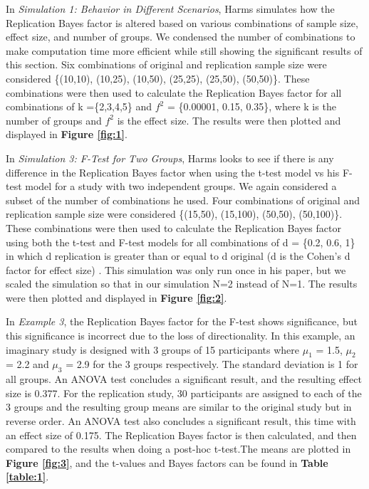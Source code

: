 \documentclass[11pt]{article}
\begin{document}
In \textit{Simulation 1: Behavior in Different Scenarios}, Harms simulates how the Replication Bayes factor is altered based on various combinations of sample size, effect size, and number of groups. We condensed the number of combinations to make computation time more efficient while still showing the significant results of this section. Six combinations of original and replication sample size were considered \{(10,10), (10,25), (10,50), (25,25), (25,50), (50,50)\}. These combinations were then used to calculate the Replication Bayes factor for all combinations of k =\{2,3,4,5\} and $f^2$ = \{0.00001, 0.15, 0.35\}, where k is the number of groups and $f^2$ is the effect size. The results were then plotted and displayed in \textbf{Figure \ref{fig:1}}.


In \textit{Simulation 3: F-Test for Two Groups}, Harms looks to see if there is any difference in the Replication Bayes factor when using the t-test model vs his F-test model for a study with two independent groups. We again considered a subset of the number of combinations he used. Four combinations of original and replication sample size were considered \{(15,50), (15,100), (50,50), (50,100)\}. These combinations were then used to calculate the Replication Bayes factor using both the t-test and F-test models for all combinations of d = \{0.2, 0.6, 1\} in which d replication is greater than or equal to d original (d is the Cohen’s d factor for effect size) \citep{cohen1988}. This simulation was only run once in his paper, but we scaled the simulation so that in our simulation N=2 instead of N=1. The results were then plotted and displayed in \textbf{Figure \ref{fig:2}}.

In \textit{Example 3}, the Replication Bayes factor for the F-test shows significance, but this significance is incorrect due to the loss of directionality. In this example, an imaginary study is designed with 3 groups of 15 participants where $\mu_1$ = 1.5, $\mu_2$ = 2.2 and $\mu_3$ = 2.9 for the 3 groups respectively. The standard deviation is 1 for all groups. An ANOVA test concludes a significant result, and the resulting effect size is 0.377. For the replication study, 30 participants are assigned to each of the 3 groups and the resulting group means are similar to the original study but in reverse order. An ANOVA test also concludes a significant result, this time with an effect size of 0.175. The Replication Bayes factor is then calculated, and then compared to the results when doing a post-hoc t-test.The means are plotted in \textbf{Figure \ref{fig:3}}, and the t-values and Bayes factors can be found in \textbf{Table \ref{table:1}}.
\end{document}
